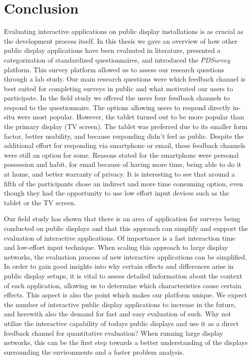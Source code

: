 \section{Conclusion}
\label{chapter:conclusion}

	Evaluating interactive applications on public display installations is as crucial as the development process itself. In this thesis we gave an overview of how other public display applications have been evaluated in literature, presented a categorization of standardized questionnaires, and introduced the \textit{PDSurvey} platform. This survey platform allowed us to assess our research questions through a lab study. Our main research questions were which feedback channel is best suited for completing surveys in public and what motivated our users to participate. 
	In the field study we offered the users four feedback channels to respond to the questionnaire. The options allowing users to respond directly in-situ were most popular. However, the tablet turned out to be more popular than the primary display (TV screen). The tablet was preferred due to its smaller form factor, better usability, and because responding didn't feel as public. Despite the additional effort for responding via smartphone or email, these feedback channels were still an option for some. Reasons stated for the smartphone were personal possession and habit, for email because of having more time, being able to do it at home, and better warranty of privacy. It is interesting to see that around a fifth of the participants chose an indirect and more time consuming option, even though they had the opportunity to use low effort input devices such as the tablet or the TV screen.

	Our field study has shown that there is an area of application for surveys being conducted on public displays and that this approach can simplify and support the evaluation of interactive applications. Of importance is a fast interaction time and low-effort input technique. When scaling this approach to large display networks, the evaluation process of new interactive applications can be simplified. In order to gain good insights into why certain effects and differences arise in public display setups, it is vital to assess detailed information about the context of each application, allowing us to determine which characteristics cause certain effects. This aspect is also the point which makes our platform unique. 
	We expect the number of interactive public display applications to increase in the future, and herewith also the demand for fast and easy evaluation of such. Why not utilize the interactive capability of todays public displays and use it as a direct feedback channel for quantitative evaluation? When running large display networks, this can be the first step towards a better understanding of the displays surrounding the environments and a faster problem analysis.

